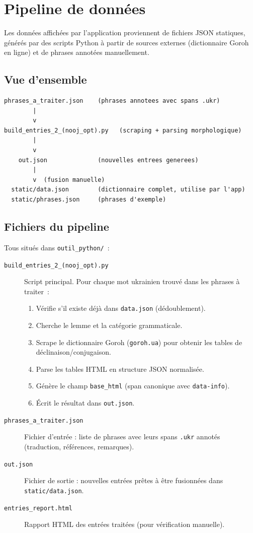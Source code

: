 \section{Pipeline de données}

Les données affichées par l'application proviennent de fichiers JSON statiques, générés par des scripts Python à partir de sources externes (dictionnaire Goroh en ligne) et de phrases annotées manuellement.

\subsection{Vue d'ensemble}

\begin{lstlisting}[title=Pipeline de generation des donnees]
phrases_a_traiter.json    (phrases annotees avec spans .ukr)
        |
        v
build_entries_2_(nooj_opt).py   (scraping + parsing morphologique)
        |
        v
    out.json              (nouvelles entrees generees)
        |
        v  (fusion manuelle)
  static/data.json        (dictionnaire complet, utilise par l'app)
  static/phrases.json     (phrases d'exemple)
\end{lstlisting}

\subsection{Fichiers du pipeline}

Tous situés dans \texttt{outil\_python/}~:

\begin{description}
  \item[\texttt{build\_entries\_2\_(nooj\_opt).py}] Script principal. Pour chaque mot ukrainien trouvé dans les phrases à traiter~:
  \begin{enumerate}
    \item Vérifie s'il existe déjà dans \texttt{data.json} (dédoublement).
    \item Cherche le lemme et la catégorie grammaticale.
    \item Scrape le dictionnaire Goroh (\texttt{goroh.ua}) pour obtenir les tables de déclinaison/conjugaison.
    \item Parse les tables HTML en structure JSON normalisée.
    \item Génère le champ \texttt{base\_html} (span canonique avec \texttt{data-info}).
    \item Écrit le résultat dans \texttt{out.json}.
  \end{enumerate}

  \item[\texttt{phrases\_a\_traiter.json}] Fichier d'entrée : liste de phrases avec leurs spans \texttt{.ukr} annotés (traduction, références, remarques).

  \item[\texttt{out.json}] Fichier de sortie : nouvelles entrées prêtes à être fusionnées dans \texttt{static/data.json}.

  \item[\texttt{entries\_report.html}] Rapport HTML des entrées traitées (pour vérification manuelle).
\end{description}

